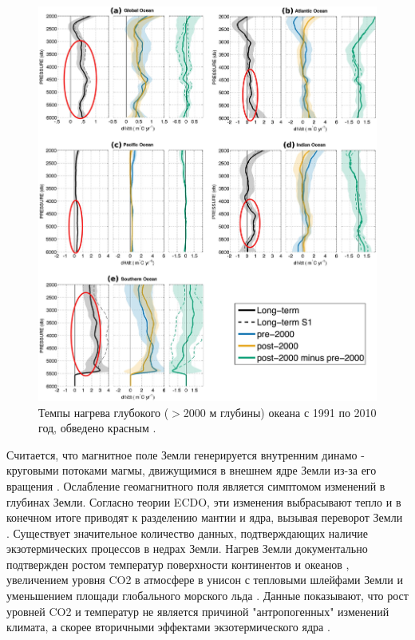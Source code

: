 \documentclass[10pt,twocolumn,letterpaper]{article}
\begin{document}
\begin{figure}[t]
\begin{center}
   \includegraphics[width=1\linewidth]{ocean-highlight.jpg}
\end{center}
   \caption{Темпы нагрева глубокого ($>$2000 м глубины) океана с 1991 по 2010 год, обведено красным \cite{132}.}
\label{fig:15}
\label{fig:onecol}
\end{figure}

Считается, что магнитное поле Земли генерируется внутренним динамо - круговыми потоками магмы, движущимися в внешнем ядре Земли из-за его вращения \cite{123}. Ослабление геомагнитного поля является симптомом изменений в глубинах Земли. Согласно теории ECDO, эти изменения выбрасывают тепло и в конечном итоге приводят к разделению мантии и ядра, вызывая переворот Земли \cite{1}.
Существует значительное количество данных, подтверждающих наличие экзотермических процессов в недрах Земли. Нагрев Земли документально подтвержден ростом температур поверхности континентов и океанов \cite{127,128}, увеличением уровня CO2 в атмосфере в унисон с тепловыми шлейфами Земли \cite{129,130} и уменьшением площади глобального морского льда \cite{131}. Данные показывают, что рост уровней CO2 и температур не является причиной "антропогенных" изменений климата, а скорее вторичными эффектами экзотермического ядра \cite{129}.
\end{document}
